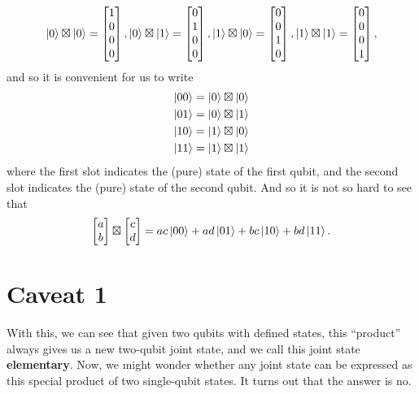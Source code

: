 \documentclass[a4paper,11pt]{article}
\numberwithin{equation}{section}
\theoremstyle{definition}
\begin{document}
\begin{align*}
\left\vert{0}\right\rangle\boxtimes \left\vert{0}\right\rangle
=
\begin{bmatrix}
1\\0\\0\\0
\end{bmatrix}, \left\vert{0}\right\rangle\boxtimes \left\vert{1}\right\rangle
=
\begin{bmatrix}
0\\1\\0\\0
\end{bmatrix}, \left\vert{1}\right\rangle\boxtimes \left\vert{0}\right\rangle
=
\begin{bmatrix}
0\\0\\1\\0
\end{bmatrix}, \left\vert{1}\right\rangle\boxtimes \left\vert{1}\right\rangle
=
\begin{bmatrix}
0\\0\\0\\1
\end{bmatrix}, 
\end{align*}
and so it is convenient for us to write
\begin{align*}
\left\vert{00}\right\rangle = \left\vert{0}\right\rangle \boxtimes \left\vert{0}\right\rangle\\
\left\vert{01}\right\rangle = \left\vert{0}\right\rangle \boxtimes \left\vert{1}\right\rangle\\
\left\vert{10}\right\rangle = \left\vert{1}\right\rangle \boxtimes \left\vert{0}\right\rangle\\
\left\vert{11}\right\rangle = \left\vert{1}\right\rangle \boxtimes \left\vert{1}\right\rangle
\end{align*}
where the first slot indicates the (pure) state of the first qubit, and the second slot indicates the (pure) state of the second qubit. And so it is not so hard to see that
\begin{align*}
\begin{bmatrix}
a\\b
\end{bmatrix}
\boxtimes
\begin{bmatrix}
c\\d
\end{bmatrix} = ac\left\vert{00}\right\rangle + ad\left\vert{01}\right\rangle + bc\left\vert{10}\right\rangle + bd\left\vert{11}\right\rangle. 
\end{align*}

\section{Caveat 1}
With this, we can see that given two qubits with defined states, this ``product'' always gives us a new two-qubit joint state, and we call this joint state \textbf{elementary}. Now, we might wonder whether any joint state can be expressed as this special product of two single-qubit states. It turns out that the answer is no. 
\end{document}
